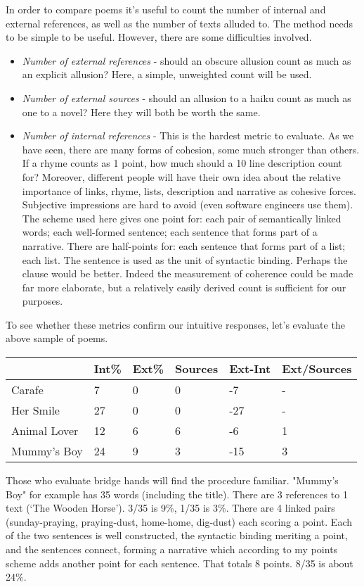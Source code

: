 \documentclass[11pt]{article}
\begin{document}
In order to compare poems it’s useful to count the number of internal and external references, as well as the number of texts alluded to. The method needs to be simple to be useful. However, there are some difficulties involved.
\begin{itemize}
\item    \textit{Number of external references} - should an obscure allusion count as much as an explicit allusion? Here, a simple, unweighted count will be used.
  \item   \textit{Number of external sources} - should an allusion to a haiku count as much as one to a novel? Here they will both be worth the same.
 \item    \textit{Number of internal references} - This is the hardest metric to evaluate. As we have seen, there are many forms of cohesion, some much stronger than others. If a rhyme counts as 1 point, how much should a 10 line description count for? Moreover, different people will have their own idea about the relative importance of links, rhyme, lists, description and narrative as cohesive forces. Subjective impressions are hard to avoid (even software engineers use them). The scheme used here gives one point for: each pair of semantically linked words; each well-formed sentence; each sentence that forms part of a narrative. There are half-points for: each sentence that forms part of a list; each list. The sentence is used as the unit of syntactic binding. Perhaps the clause would be better. Indeed the measurement of coherence could be made far more elaborate, but a relatively easily derived count is sufficient for our purposes.
\end{itemize}
To see whether these metrics confirm our intuitive responses, let's evaluate the above sample of poems.
\begin{table}[htbp]
\centering
\begin{tabular}{|l|l|l|l|l|l|}\hline
         & Int\% & Ext\% & Sources & Ext-Int	& Ext/Sources\\\hline
Carafe	& 	7	& 	0	& 	0	& 	-7 &	-\\\hline
Her Smile	& 	27	& 	0	& 	0	& -27 & -\\\hline
Animal Lover	& 	12	& 	6	& 	6	& 	-6 & 1\\\hline
Mummy’s Boy	& 	24	& 	9	& 	3	& 	-15 & 3\\\hline
\end{tabular}
\end{table}
Those who evaluate bridge hands will find the procedure familiar. "Mummy’s Boy" for example has 35 words (including the title). There are 3 references to 1 text (‘The Wooden Horse’). 3/35 is 9\%, 1/35 is 3\%. There are 4 linked pairs (sunday-praying, praying-dust, home-home, dig-dust) each scoring a point. Each of the two sentences is well constructed, the syntactic binding meriting a point, and the sentences connect, forming a narrative which according to my points scheme adds another point for each sentence. That totals 8 points. 8/35 is about 24\%.
\end{document}
